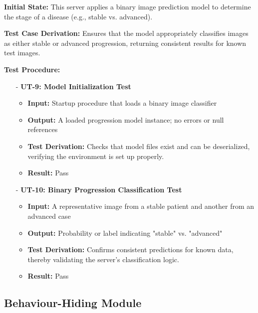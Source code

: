 \documentclass[12pt, titlepage]{article}
\begin{document}
\noindent \textbf{Initial State:}
This server applies a binary image prediction model to determine the stage of a disease (e.g., stable vs. advanced).
\vspace{10pt}

\noindent \textbf{Test Case Derivation:}
Ensures that the model appropriately classifies images as either stable or advanced progression, returning consistent results for known test images.
\vspace{10pt}

\noindent \textbf{Test Procedure:}
\begin{itemize}
    \item[-] \textbf{UT-9: Model Initialization Test} \label{test:progress-model-init}
    \begin{itemize}
      \item \textbf{Input:} Startup procedure that loads a binary image classifier
      \item \textbf{Output:} A loaded progression model instance; no errors or null references
      \item \textbf{Test Derivation:} Checks that model files exist and can be deserialized, verifying the environment is set up properly.
      \item \textbf{Result:} Pass
    \end{itemize}

    \item[-] \textbf{UT-10: Binary Progression Classification Test} \label{test:progress-binary-class}
    \begin{itemize}
      \item \textbf{Input:} A representative image from a stable patient and another from an advanced case
      \item \textbf{Output:} Probability or label indicating "stable" vs. "advanced" 
      \item \textbf{Test Derivation:} Confirms consistent predictions for known data, thereby validating the server's classification logic.
      \item \textbf{Result:} Pass
    \end{itemize}
\end{itemize}


\subsection{Behaviour-Hiding Module}
\end{document}
